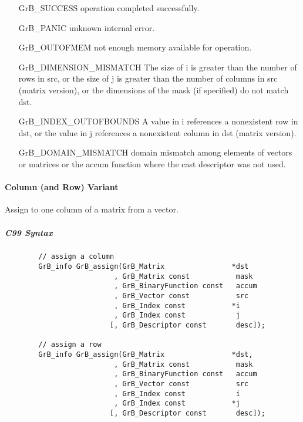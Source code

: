 \begin{itemize}[leftmargin=2.1in]
\item[{\sf GrB\_SUCCESS}]      operation completed successfully.
\item[{\sf GrB\_PANIC}]        unknown internal error.
\item[{\sf GrB\_OUTOFMEM}]     not enough memory available for operation.
\item[{\sf GrB\_DIMENSION\_MISMATCH}] 
        The size of i is greater than the number of rows in src, or
        the size of j is greater than the number of columns in src (matrix version), or
        the dimensions of the mask (if specified) do not match dst.
\item[{\sf GrB\_INDEX\_OUTOFBOUNDS}]
        A value in i references a nonexistent row in dst, or
        the value in j references a nonexistent column in dst (matrix version).
\item[\sf GrB\_DOMAIN\_MISMATCH]  
       domain mismatch among elements of vectors or matrices or the accum function where the cast descriptor was not used.
\end{itemize}


\paragraph{Column (and Row) Variant}

Assign to one column of a matrix from a vector.  

\subparagraph{C99 Syntax}

\begin{verbatim}
        // assign a column
        GrB_info GrB_assign(GrB_Matrix                *dst
                          , GrB_Matrix const           mask
                          , GrB_BinaryFunction const   accum
                          , GrB_Vector const           src
                          , GrB_Index const           *i
                          , GrB_Index const            j
                         [, GrB_Descriptor const       desc]); 

        // assign a row
        GrB_info GrB_assign(GrB_Matrix                *dst,
                          , GrB_Matrix const           mask
                          , GrB_BinaryFunction const   accum
                          , GrB_Vector const           src
                          , GrB_Index const            i
                          , GrB_Index const           *j
                         [, GrB_Descriptor const       desc]); 
\end{verbatim}


